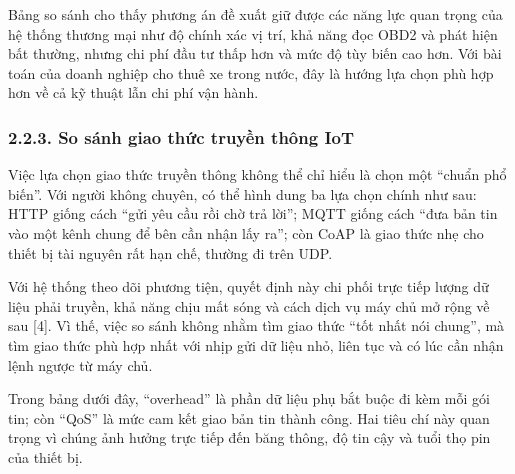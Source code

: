 \documentclass[a4paper]{extarticle}
\begin{document}
Bảng so sánh cho thấy phương án đề xuất giữ được các năng lực quan trọng
của hệ thống thương mại như độ chính xác vị trí, khả năng đọc OBD2 và
phát hiện bất thường, nhưng chi phí đầu tư thấp hơn và mức độ tùy biến
cao hơn. Với bài toán của doanh nghiệp cho thuê xe trong nước, đây là
hướng lựa chọn phù hợp hơn về cả kỹ thuật lẫn chi phí vận hành.

\subsubsection{2.2.3. So sánh giao thức truyền thông
IoT}\label{223-so-suxe1nh-giao-thux1ee9c-truyux1ec1n-thuxf4ng-iot}

Việc lựa chọn giao thức truyền thông không thể chỉ hiểu là chọn một
``chuẩn phổ biến''. Với người không chuyên, có thể hình dung ba lựa chọn
chính như sau: HTTP giống cách ``gửi yêu cầu rồi chờ trả lời''; MQTT
giống cách ``đưa bản tin vào một kênh chung để bên cần nhận lấy ra'';
còn CoAP là giao thức nhẹ cho thiết bị tài nguyên rất hạn chế,
thường đi trên UDP.

Với hệ thống theo dõi phương tiện, quyết định này chi phối trực tiếp
lượng dữ liệu phải truyền, khả năng chịu mất sóng và cách dịch vụ máy
chủ mở rộng về sau {[}4{]}. Vì thế, việc so sánh không nhằm tìm giao
thức ``tốt nhất nói chung'', mà tìm giao thức phù hợp nhất với nhịp gửi
dữ liệu nhỏ, liên tục và có lúc cần nhận lệnh ngược từ máy chủ.

Trong bảng dưới đây, ``overhead'' là phần dữ liệu phụ bắt buộc đi kèm
mỗi gói tin; còn ``QoS'' là mức cam kết giao bản tin thành công. Hai
tiêu chí này quan trọng vì chúng ảnh hưởng trực tiếp đến băng thông, độ
tin cậy và tuổi thọ pin của thiết bị.
\end{document}
